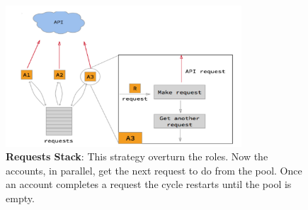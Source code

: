 \documentclass[10pt,a4paper]{article}
\begin{document}
 \pagebreak
     \begin{figure}[ht!]
 \hfill \includegraphics[width=250pt]{images/multi-account-stack}
 \hspace*{\fill}
 \caption{\textbf{Requests Stack}: This strategy overturn the roles. Now the accounts, in parallel, get the next request to do from the pool. Once an account completes a request the cycle restarts until the pool is empty.}
 \end{figure}
\end{document}
